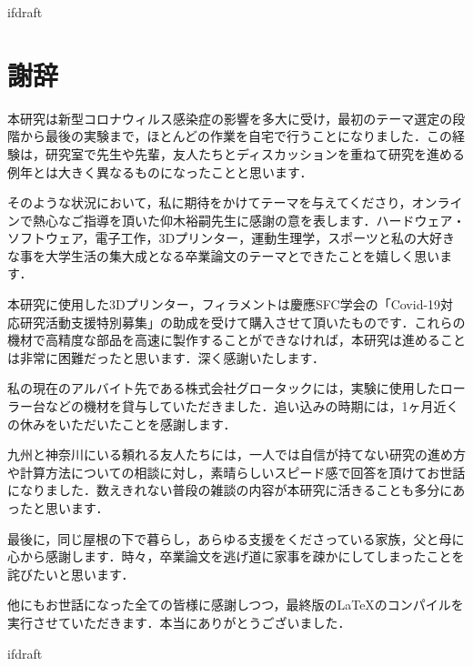 \expandafter\ifx\csname ifdraft\endcsname\relax
 
\fi

\section*{謝辞}

本研究は新型コロナウィルス感染症の影響を多大に受け，最初のテーマ選定の段階から最後の実験まで，ほとんどの作業を自宅で行うことになりました．この経験は，研究室で先生や先輩，友人たちとディスカッションを重ねて研究を進める例年とは大きく異なるものになったことと思います．

そのような状況において，私に期待をかけてテーマを与えてくださり，オンラインで熱心なご指導を頂いた仰木裕嗣先生に感謝の意を表します．ハードウェア・ソフトウェア，電子工作，3Dプリンター，運動生理学，スポーツと私の大好きな事を大学生活の集大成となる卒業論文のテーマとできたことを嬉しく思います．

本研究に使用した3Dプリンター，フィラメントは慶應SFC学会の「Covid-19対応研究活動支援特別募集」の助成を受けて購入させて頂いたものです．これらの機材で高精度な部品を高速に製作することができなければ，本研究は進めることは非常に困難だったと思います．深く感謝いたします．

私の現在のアルバイト先である株式会社グロータックには，実験に使用したローラー台などの機材を貸与していただきました．追い込みの時期には，1ヶ月近くの休みをいただいたことを感謝します．

九州と神奈川にいる頼れる友人たちには，一人では自信が持てない研究の進め方や計算方法についての相談に対し，素晴らしいスピード感で回答を頂けてお世話になりました．数えきれない普段の雑談の内容が本研究に活きることも多分にあったと思います．

最後に，同じ屋根の下で暮らし，あらゆる支援をくださっている家族，父と母に心から感謝します．時々，卒業論文を逃げ道に家事を疎かにしてしまったことを詫びたいと思います．

他にもお世話になった全ての皆様に感謝しつつ，最終版のLaTeXのコンパイルを実行させていただきます．本当にありがとうございました．

\expandafter\ifx\csname ifdraft\endcsname\relax
  
\fi
